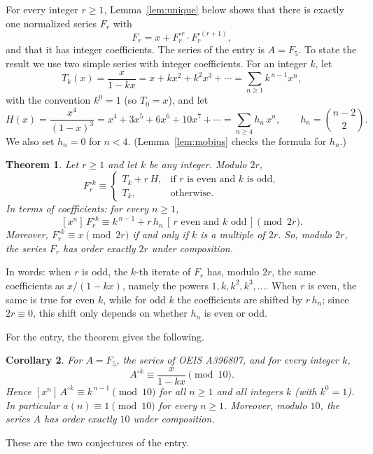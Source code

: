 \documentclass[11pt,a4paper]{article}
\newtheorem{theorem}{Theorem}[section]
\newtheorem{corollary}[theorem]{Corollary}
\theoremstyle{definition}
\theoremstyle{remark}
\newcommand{\coeff}[2]{[x^{#1}]\,#2}
\begin{document}
For every integer $r\ge1$, Lemma~\ref{lem:unique} below shows that there is exactly one normalized series $F_r$ with
\begin{equation}\label{eq:family}
F_r=x+F_r^{\circ r}\cdot F_r^{\circ(r+1)},
\end{equation}
and that it has integer coefficients. The series of the entry is $A=F_{5}$. To state the result we use
two simple series with integer coefficients. For an integer $k$, let
\[
T_k(x)=\frac{x}{1-kx}=x+kx^2+k^2x^3+\cdots=\sum_{n\ge1}k^{\,n-1}x^n ,
\]
with the convention $k^0=1$ (so $T_0=x$), and let
\[
H(x)=\frac{x^4}{(1-x)^3}=x^4+3x^5+6x^6+10x^7+\cdots=\sum_{n\ge4}h_n\,x^n,\qquad h_n=\binom{n-2}{2}.
\]
We also set $h_n=0$ for $n<4$. (Lemma~\ref{lem:mobius} checks the formula for $h_n$.)

\begin{theorem}\label{thm:general}
Let $r\ge1$ and let $k$ be any integer. Modulo $2r$,
\[
F_r^{\circ k}\equiv
\begin{cases}
T_k+r\,H, & \text{if $r$ is even and $k$ is odd},\\
T_k, & \text{otherwise}.
\end{cases}
\]
In terms of coefficients: for every $n\ge1$,
\[
\coeff{n}{F_r^{\circ k}}\equiv k^{\,n-1}+r\,h_n\,[\,r\text{ even and }k\text{ odd}\,]\pmod{2r}.
\]
Moreover, $F_r^{\circ k}\equiv x\pmod{2r}$ if and only if $k$ is a multiple of $2r$. So, modulo $2r$, the series $F_r$
has order exactly $2r$ under composition.
\end{theorem}

In words: when $r$ is odd, the $k$-th iterate of $F_r$ has, modulo $2r$, the same coefficients as $x/(1-kx)$,
namely the powers $1,k,k^2,k^3,\dots$. When $r$ is even, the same is true for even $k$, while for odd $k$ the
coefficients are shifted by $r\,h_n$; since $2r\equiv0$, this shift only depends on whether $h_n$ is even or odd.

For the entry, the theorem gives the following.

\begin{corollary}\label{cor:app}
For $A=F_5$, the series of OEIS A396807, and for every integer $k$,
\[
A^{\circ k}\equiv\frac{x}{1-kx}\pmod{10} .
\]
Hence $\coeff{n}{A^{\circ k}}\equiv k^{\,n-1}\pmod{10}$ for all $n\ge1$ and all integers $k$ (with $k^0=1$). In
particular $a(n)\equiv1\pmod{10}$ for every $n\ge1$. Moreover, modulo $10$, the series $A$ has order exactly $10$
under composition.
\end{corollary}
These are the two conjectures of the entry.
\end{document}
